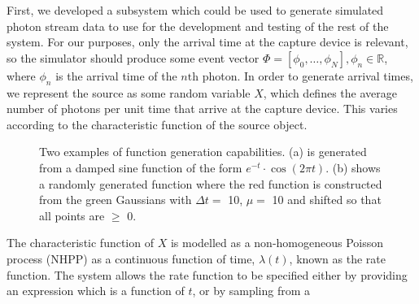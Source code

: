 \documentclass[a4paper,11pt]{article}
\begin{document}
  First, we developed a subsystem which could be used to generate simulated
  photon stream data to use for the development and testing of the rest of the
  system. For our purposes, only the arrival time at the capture device is
  relevant, so the simulator should produce some event vector
  $\Phi=\left[\phi_0,\dots,\phi_N\right], \phi_n \in \mathbb{R}$, where $\phi_n$
  is the arrival time of the $n\text{th}$ photon. In order to generate arrival
  times, we represent the source as some random variable $X$, which defines the
  average number of photons per unit time that arrive at the capture
  device. This varies according to the characteristic function of the source
  object.
   \begin{figure}

   \caption{Two examples of function generation capabilities. (a) is generated
   from a damped sine function of the form $e^{-t}\cdot \cos(2\pi t)$. (b) shows
   a randomly generated function where the red function is constructed from the
   green Gaussians with $\Delta t=$ 10, $\mu=$ 10 and shifted so that all points
   are $\geq$ 0.}

   \label{fig:contrib}
   \end{figure}
  The characteristic function of $X$ is modelled as a non-homogeneous Poisson
  process (NHPP) as a continuous function of time, $\lambda(t)$, known as the
  rate function. The system allows the rate function to be specified either by
  providing an expression which is a function of $t$, or by sampling from a
\end{document}
